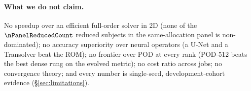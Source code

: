 \paragraph{What we do not claim.} No speedup over an efficient full-order
solver in 2D (none of the $\nPanelReducedCount$ reduced subjects in the
same-allocation panel is non-dominated); no accuracy superiority over neural
operators (a U-Net and a Transolver beat the ROM); no frontier over POD at
every rank (POD-512 beats the best dense rung on the evolved metric); no cost
ratio across jobs; no convergence theory; and every number is single-seed,
development-cohort evidence (\S\ref{sec:limitations}).

